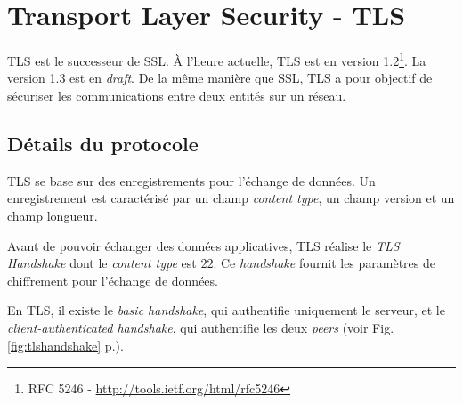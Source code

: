 \section{Transport Layer Security - TLS}
TLS est le successeur de SSL.
À l'heure actuelle, TLS est en version 1.2\footnote{RFC 5246 - \url{http://tools.ietf.org/html/rfc5246}}. 
La version 1.3 est en \textit{draft}.
De la même manière que SSL, TLS a pour objectif de sécuriser les communications entre deux entités sur un réseau.

\subsection{Détails du protocole}
TLS se base sur des enregistrements pour l'échange de données.
Un enregistrement est caractérisé par un champ \textit{content type}, un champ version et un champ longueur.

Avant de pouvoir échanger des données applicatives, TLS réalise le \textit{TLS Handshake} dont le \textit{content type} est $22$.
Ce \textit{handshake} fournit les paramètres de chiffrement pour l'échange de données.

En TLS, il existe le \textit{basic handshake}, qui authentifie uniquement le serveur, et le \textit{client-authenticated handshake}, qui authentifie les deux \textit{peers} (voir Fig.\ref{fig:tlshandshake} p.\pageref{fig:tlshandshake}).

